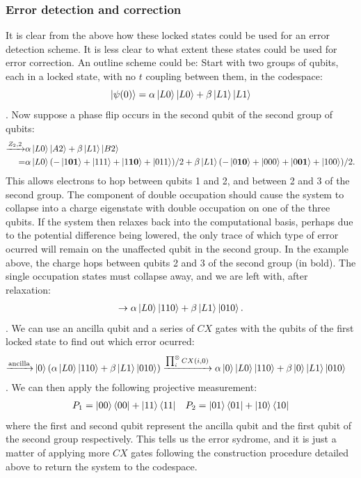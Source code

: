 \documentclass{report}
\begin{document}
\begin{appendices}
\subsubsection{Error detection and correction}
It is clear from the above how these locked states could be used for an error detection scheme. It is less clear to what extent these states could be used for error correction. An outline scheme could be:
Start with two groups of qubits, each in a locked state, with no $t$ coupling between them, in the codespace:
\begin{equation*}
    \ket{\psi(0)} = \alpha\ket{L0}\ket{L0} + \beta\ket{L1}\ket{L1}
\end{equation*}. Now suppose a phase flip occurs in the second qubit of the second group of qubits:
\begin{align*}
    \xrightarrow{Z_2,2} &\alpha\ket{L0}\ket{A2} + \beta\ket{L1}\ket{B2}\\
    =&\alpha\ket{L0}(-\ket{1\mathbf{01}} + \ket{111} + \ket{1\mathbf{10}}+\ket{011})/2 + \beta\ket{L1}(-\ket{0\mathbf{10}} + \ket{000} + \ket{0\mathbf{01}}+\ket{100})/2.
\end{align*}
This allows electrons to hop between qubits 1 and 2, and between 2 and 3 of the second group. The component of double occupation should cause the system to collapse into a charge eigenstate with double occupation on one of the three qubits. If the system then relaxes back into the computational basis, perhaps due to the potential difference being lowered, the only trace of which type of error ocurred will remain on the unaffected qubit in the second group. In the example above, the charge hops between qubits 2 and 3 of the second group (in bold). The single occupation states must collapse away, and we are left with, after relaxation:
\begin{align*}
    \rightarrow\alpha\ket{L0}\ket{110} + \beta\ket{L1}\ket{010}.
\end{align*}. We can use an ancilla qubit and a series of $CX$ gates with the qubits of the first locked state to find out which error ocurred:
\begin{align*}
    \xrightarrow{\text{ancilla}} & \ket{0}(\alpha\ket{L0}\ket{110} + \beta\ket{L1}\ket{010})
    \xrightarrow{\prod_i^\otimes CX(i,0)}\alpha\ket{0}\ket{L0}\ket{110} + \beta\ket{0}\ket{L1}\ket{010}
\end{align*}. We can then apply the following projective measurement:
\begin{align*}
    P_1 = \ket{00}\bra{00} + \ket{11}\bra{11} && P_2 = \ket{01}\bra{01} + \ket{10}\bra{10}
\end{align*}
where the first and second qubit represent the ancilla qubit and the first qubit of the second group respectively. This tells us the error sydrome, and it is just a matter of applying more $CX$ gates following the construction procedure detailed above to return the system to the codespace.
\end{appendices}
\end{document}

